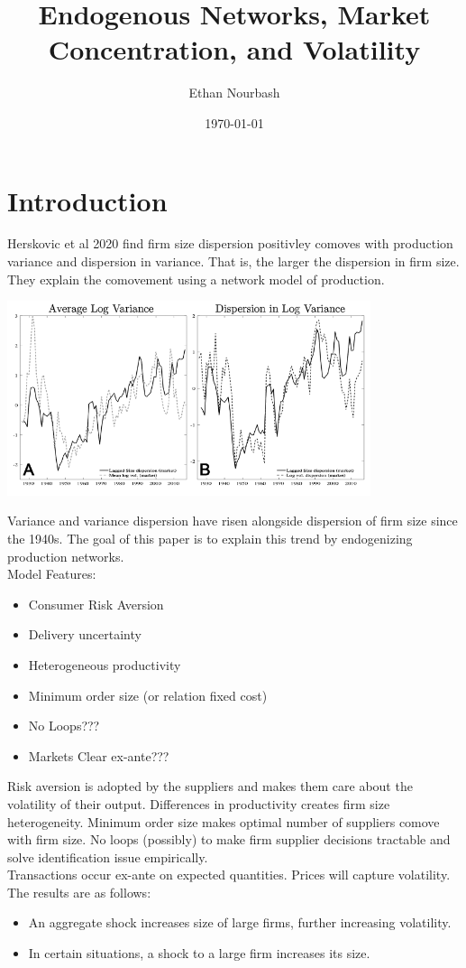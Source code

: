 \documentclass{article}
\title{Endogenous Networks, Market Concentration, and Volatility}
\author{Ethan Nourbash}
\date{\today}
\begin{document}
\maketitle
\section{Introduction}
Herskovic et al 2020 find firm size dispersion positivley comoves with production variance and dispersion in variance. That is, the larger the dispersion in firm size. They explain the comovement using a network model of production.
\begin{center}
    \includegraphics[width=0.8\textwidth]{figures/herskovic.png}
\end{center}
Variance and variance dispersion have risen alongside dispersion of firm size since the 1940s. 
The goal of this paper is to explain this trend by endogenizing production networks. \\
Model Features:
\begin{itemize}
    \item Consumer Risk Aversion
    \item Delivery uncertainty
    \item Heterogeneous productivity
    \item Minimum order size (or relation fixed cost)
    \item No Loops???
    \item Markets Clear ex-ante???
\end{itemize}
Risk aversion is adopted by the suppliers and makes them care about the volatility of their output. 
Differences in productivity creates firm size heterogeneity. 
Minimum order size makes optimal number of suppliers comove with firm size.
No loops (possibly) to make firm supplier decisions tractable and solve identification issue empirically.\\
Transactions occur ex-ante on expected quantities. Prices will capture volatility.
\\
The results are as follows:
\begin{itemize}
    \item An aggregate shock increases size of large firms, further increasing volatility.
    \item In certain situations, a shock to a large firm increases its size.
\end{itemize}
\end{document}
